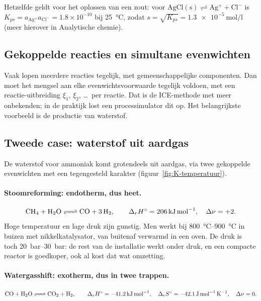 Hetzelfde geldt voor het oplossen van een zout: voor $\mathrm{AgCl(s) \rightleftharpoons Ag^+ + Cl^-}$ is $K_{ps} = a_{\mathrm{Ag^+}}a_{\mathrm{Cl^-}} = 1.8\times10^{-10}$ bij \SI{25}{\celsius}, zodat $s = \sqrt{K_{ps}} = \SI{1.3e-5}{\mole\per\litre}$ (meer hierover in Analytische chemie).

\subsection{Gekoppelde reacties en simultane evenwichten}
\label{sec:gekoppelde-reacties}

Vaak lopen meerdere reacties tegelijk, met gemeenschappelijke componenten. Dan moet het mengsel aan elke evenwichtsvoorwaarde tegelijk voldoen, met een reactie-uitbreiding $\xi_1$, $\xi_2$, \ldots\ per reactie. Dat is de ICE-methode met meer onbekenden; in de praktijk lost een processimulator dit op. Het belangrijkste voorbeeld is de productie van waterstof.

\subsection{Tweede case: waterstof uit aardgas}
\label{sec:case-waterstof}

De waterstof voor ammoniak komt grotendeels uit aardgas, via twee gekoppelde evenwichten met een tegengesteld karakter (figuur~\ref{fig:K-temperatuur}).

\paragraph{Stoomreforming: endotherm, dus heet.}
\[
\ce{CH4 + H2O <=> CO + 3 H2}, \qquad \Delta_r H^\circ = \SI{+206}{\kilo\joule\per\mole},\quad \Delta\nu = +2.
\]
Hoge temperatuur en lage druk zijn gunstig. Men werkt bij \SIrange{800}{900}{\celsius} in buizen met nikkelkatalysator, van buitenaf verwarmd in een oven. De druk is toch \SIrange{20}{30}{\bar}: de rest van de installatie werkt onder druk, en een compacte reactor is goedkoper, ook al kost dat wat omzetting.

\paragraph{Watergasshift: exotherm, dus in twee trappen.}
\[
\ce{CO + H2O <=> CO2 + H2}, \qquad \Delta_r H^\circ = \SI{-41.2}{\kilo\joule\per\mole},\quad \Delta_r S^\circ = \SI{-42.1}{\joule\per\mole\per\kelvin},\quad \Delta\nu = 0.
\]

